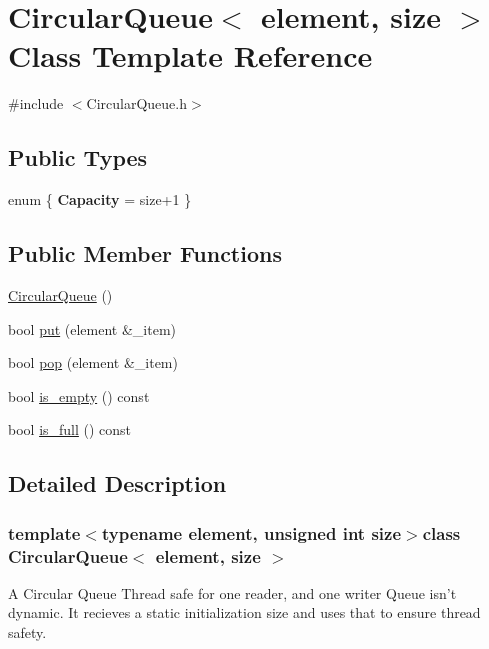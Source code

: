 \hypertarget{class_circular_queue}{
\section{CircularQueue$<$ element, size $>$ Class Template Reference}
\label{class_circular_queue}
}


{\ttfamily \#include $<$CircularQueue.h$>$}

\subsection*{Public Types}
\begin{DoxyCompactItemize}
\item 
enum \{ {\bfseries Capacity} =  size+1
 \}
\end{DoxyCompactItemize}
\subsection*{Public Member Functions}
\begin{DoxyCompactItemize}
\item 
\hyperlink{class_circular_queue_a91b8a2001622c02f8aa2743bcbef429f}{CircularQueue} ()
\item 
bool \hyperlink{class_circular_queue_a9d256b9f7a99266ecefd4b443c6b1356}{put} (element \&\_\-item)
\item 
bool \hyperlink{class_circular_queue_ab635df07d4925bad3f982660517661ea}{pop} (element \&\_\-item)
\item 
bool \hyperlink{class_circular_queue_a4004e2048b2e471d4536d416701aaa04}{is\_\-empty} () const 
\item 
bool \hyperlink{class_circular_queue_a6256f1eaa82600323bfe00f7b9b13c15}{is\_\-full} () const 
\end{DoxyCompactItemize}


\subsection{Detailed Description}
\subsubsection*{template$<$typename element, unsigned int size$>$class CircularQueue$<$ element, size $>$}

A Circular Queue Thread safe for one reader, and one writer Queue isn't dynamic. It recieves a static initialization size and uses that to ensure thread safety.

